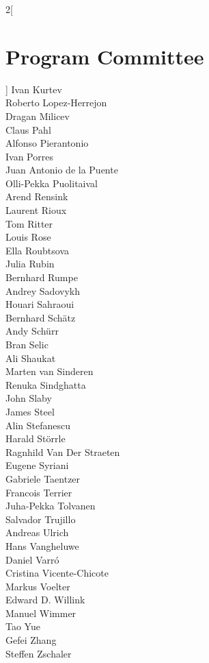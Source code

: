 \begin{multicols}{2}[\section*{Program Committee}]
Ivan Kurtev \\
Roberto Lopez-Herrejon \\
Dragan Milicev \\
Claus Pahl \\
Alfonso Pierantonio \\
Ivan Porres \\
Juan Antonio de la Puente \\
Olli-Pekka Puolitaival \\
Arend Rensink \\
Laurent Rioux \\
Tom Ritter \\
Louis Rose \\
Ella Roubtsova \\
Julia Rubin \\
Bernhard Rumpe \\
Andrey Sadovykh \\
Houari Sahraoui \\
Bernhard Sch\"{a}tz \\
Andy Sch\"{u}rr \\
Bran Selic \\
Ali Shaukat \\
Marten van Sinderen \\
Renuka Sindghatta \\
John Slaby \\
James Steel \\
Alin Stefanescu \\
Harald St\"{o}rrle \\
Ragnhild Van Der Straeten \\
Eugene Syriani \\
Gabriele Taentzer \\
Francois Terrier \\
Juha-Pekka Tolvanen \\
Salvador Trujillo \\
Andreas Ulrich \\
Hans Vangheluwe \\
Daniel Varr\'{o} \\
Cristina Vicente-Chicote \\
Markus Voelter \\
Edward D. Willink \\
Manuel Wimmer \\
Tao Yue \\
Gefei Zhang \\
Steffen Zschaler\end{multicols}

